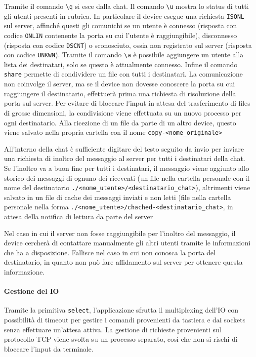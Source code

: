 \documentclass[11pt,a4paper,twocolumn,twoside]{paper}
\begin{document}
    Tramite il comando \texttt{\textbackslash{}q} si esce dalla chat. Il
    comando \texttt{\textbackslash{}u} mostra lo status di tutti gli
    utenti presenti in rubrica. In particolare il device esegue una
    richiesta \texttt{ISONL} sul server, affinché questi gli comunichi
    se un utente è connesso (risposta con codice \texttt{ONLIN}
    contenente la porta su cui l'utente è raggiungibile), disconnesso
    (risposta con codice \texttt{DSCNT}) o sconosciuto, ossia non
    registrato sul server (risposta con codice \texttt{UNKWN}). Tramite
    il comando \texttt{\textbackslash{}a} è possibile aggiungere un
    utente alla lista dei destinatari, solo se questo è attualmente
    connesso. Infine il comando \texttt{share} permette di condividere
    un file con tutti i destinatari. La comunicazione non coinvolge il
    server, ma se il device non dovesse conoscere la porta su cui
    raggiungere il destinatario, effettuerà prima una richiesta di
    risoluzione della porta sul server. Per evitare di bloccare l'input
    in attesa del trasferimento di files di grosse dimensioni, la
    condivisione viene effettuata su un nuovo processo per ogni
    destinatario. Alla ricezione di un file da parte di un altro device,
    questo viene salvato nella propria cartella con il nome
    \texttt{copy-\textless{}nome\_originale\textgreater{}}

    All'interno della chat è sufficiente digitare del testo seguito da
    invio per inviare una richiesta di inoltro del messaggio al server
    per tutti i destinatari della chat. Se l'inoltro va a buon fine per
    tutti i destinatari, il messaggio viene aggiunto allo storico dei
    messaggi di ognuno dei riceventi (un file nella cartella personale
    con il nome del destinatario
    \texttt{./\textless{}nome\_utente\textgreater{}/\textless{}destinatario\_chat\textgreater{}}),
    altrimenti viene salvato in un file di cache dei messaggi inviati e
    non letti (file nella cartella personale nella forma
    \texttt{./\textless{}nome\_utente\textgreater{}/chached-\textless{}destinatario\_chat\textgreater{}},
    in attesa della notifica di lettura da parte del server

    Nel caso in cui il server non fosse raggiungibile per l'inoltro del
    messaggio, il device cercherà di contattare manualmente gli altri
    utenti tramite le informazioni che ha a disposizione. Fallisce nel
    caso in cui non conosca la porta del destinatario, in quanto non può
    fare affidamento sul server per ottenere questa informazione.
\paragraph{Gestione del IO}
Tramite la primitiva \texttt{select}, l'applicazione sfrutta il
    multiplexing dell'IO con possibilità di timeout per gestire i
    comandi provenienti da tastiera e dai sockets senza effettuare
    un'attesa attiva. La gestione di richieste provenienti sul
    protocollo TCP viene svolta su un processo separato, così che non si
    rischi di bloccare l'input da terminale.
\end{document}
